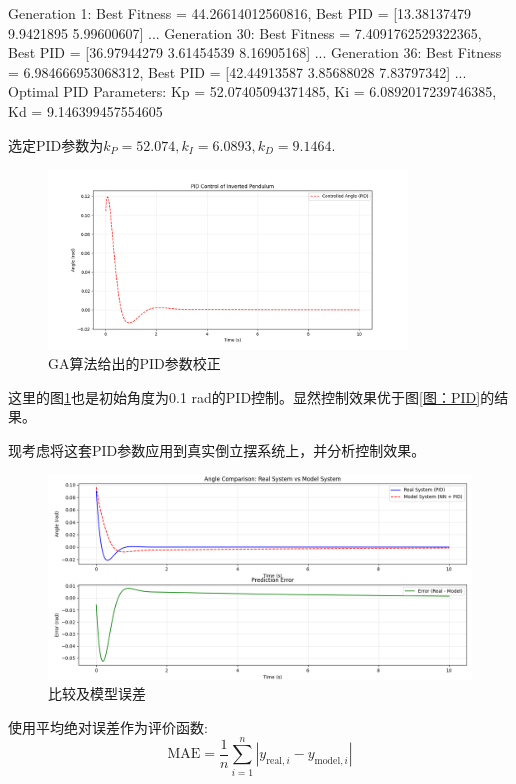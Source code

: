 \documentclass[12pt, AutoFakeBold=4]{ctexart}
\begin{document}
\begin{TermWin}[width=15cm]{}
Generation 1: Best Fitness = 44.26614012560816, Best PID = [13.38137479  9.9421895   5.99600607]
...
Generation 30: Best Fitness = 7.4091762529322365, Best PID = [36.97944279  3.61454539  8.16905168]
...
Generation 36: Best Fitness = 6.984666953068312, Best PID = [42.44913587  3.85688028  7.83797342]
...
Optimal PID Parameters: Kp = 52.07405094371485, Ki = 6.0892017239746385, Kd = 9.146399457554605
\end{TermWin}
选定PID参数为$k_P=52.074,k_I=6.0893,k_D=9.1464$.
\begin{figure}[htpb]
	\centering
	\includegraphics[width=0.85\textwidth]{PID-Best.png}
	\caption{GA算法给出的PID参数校正}
	\label{图：PID-Best}
\end{figure}
\par
这里的图\ref{图：PID-Best}也是初始角度为0.1 rad的PID控制。显然控制效果优于图\ref{图：PID}的结果。\par
现考虑将这套PID参数应用到真实倒立摆系统上，并分析控制效果。\par
\begin{figure}[htpb]
	\centering
	\includegraphics[width=\textwidth]{Real-Model.png}
	\caption{比较及模型误差}
	\label{图：Real-Model}
\end{figure}
使用平均绝对误差作为评价函数:
$$
\text{MAE} = \frac{1}{n} \sum_{i=1}^{n} |y_{\text{real}, i} - y_{\text{model}, i}| 
$$
\noindent\hfil{}\hfil\par
	
\end{document}
